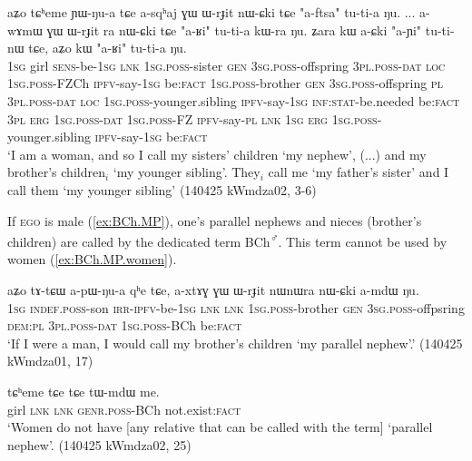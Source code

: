 \begin{exe}
\ex \label{ex:ZCh.BCh.FP}
\gll aʑo tɕʰeme ɲɯ-ŋu-a tɕe a-sqʰaj ɣɯ ɯ-rɟit nɯ-ɕki tɕe "a-ftsa" tu-ti-a ŋu.
... a-wɤmɯ ɣɯ ɯ-rɟit ra nɯ-ɕki tɕe "a-ʁi" tu-ti-a kɯ-ra ŋu. ʑara kɯ a-ɕki "a-ɲi" tu-ti-nɯ tɕe, aʑo kɯ "a-ʁi" tu-ti-a ŋu. \\
\textsc{1sg} girl \textsc{sens}-be-\textsc{1sg} \textsc{lnk} \textsc{1sg}.\textsc{poss}-sister \textsc{gen} \textsc{3sg}.\textsc{poss}-offspring \textsc{3pl}.\textsc{poss}-\textsc{dat} \textsc{loc}  \textsc{1sg}.\textsc{poss}-FZCh \textsc{ipfv}-say-\textsc{1sg} be:\textsc{fact} { } \textsc{1sg}.\textsc{poss}-brother \textsc{gen} \textsc{3sg}.\textsc{poss}-offspring \textsc{pl} \textsc{3pl}.\textsc{poss}-\textsc{dat} \textsc{loc} \textsc{1sg}.\textsc{poss}-younger.sibling \textsc{ipfv}-say-\textsc{1sg} \textsc{inf}:\textsc{stat}-be.needed be:\textsc{fact} \textsc{3pl} \textsc{erg} \textsc{1sg}.\textsc{poss}-\textsc{dat} \textsc{1sg}.\textsc{poss}-FZ \textsc{ipfv}-say-\textsc{pl} \textsc{lnk} \textsc{1sg} \textsc{erg} \textsc{1sg}.\textsc{poss}-younger.sibling \textsc{ipfv}-say-\textsc{1sg} be:\textsc{fact} \\
\glt `I am a woman, and so I call my sisters' children  `my nephew', (...) and my brother's children$_i$  `my younger sibling'. They$_i$ call me  `my father's sister' and I call them  `my younger sibling' (140425 kWmdza02, 3-6)
\end{exe}

If \textsc{ego} is male (\ref{ex:BCh.MP}), one's parallel nephews and nieces (brother's children) are called by the dedicated term  BCh\textsuperscript{♂}. This term cannot be used by women (\ref{ex:BCh.MP.women}). 

\begin{exe}
\ex \label{ex:BCh.MP}
\gll  aʑo tɤ-tɕɯ a-pɯ-ŋu-a qʰe tɕe, a-xtɤɣ ɣɯ ɯ-rɟit nɯnɯra nɯ-ɕki a-mdɯ ŋu. \\
\textsc{1sg} \textsc{indef}.\textsc{poss}-son \textsc{irr}-\textsc{ipfv}-be-\textsc{1sg} \textsc{lnk} \textsc{lnk} \textsc{1sg}.\textsc{poss}-brother \textsc{gen} \textsc{3sg}.\textsc{poss}-offpsring \textsc{dem}:\textsc{pl} \textsc{3pl}.\textsc{poss}-\textsc{dat} \textsc{1sg}.\textsc{poss}-BCh be:\textsc{fact} \\
\glt `If I were a man, I would call my brother's children  `my parallel nephew'.' (140425 kWmdza01, 17)
\end{exe}


\begin{exe}
\ex \label{ex:BCh.MP.women}
\gll tɕʰeme tɕe tɕe tɯ-mdɯ me. \\
girl \textsc{lnk} \textsc{lnk} \textsc{genr}.\textsc{poss}-BCh not.exist:\textsc{fact} \\
\glt `Women do not have [any relative that can be called with the term]  `parallel nephew'. (140425 kWmdza02, 25)
\end{exe}

